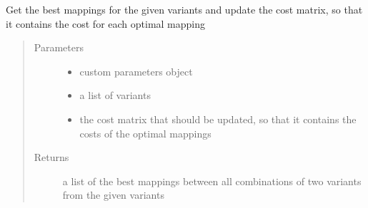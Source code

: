 \documentclass[letterpaper,10pt,english]{sphinxmanual}
\begin{document}

\begin{fulllineitems}
\label{\detokenize{cost function:costFunction.cost.bestMappings}}
Get the best mappings for the given variants and update the cost matrix, so that it contains the cost for each optimal mapping
\begin{quote}\begin{description}
\item[{Parameters}] \leavevmode\begin{itemize}
\item {} 
 \textendash{} custom parameters object

\item {} 
 \textendash{} a list of variants

\item {} 
 \textendash{} the cost matrix that should be updated, so that it contains the costs of the optimal mappings

\end{itemize}

\item[{Returns}] \leavevmode
a list of the best mappings between all combinations of two variants from the given variants

\end{description}\end{quote}

\end{fulllineitems}

\end{document}
